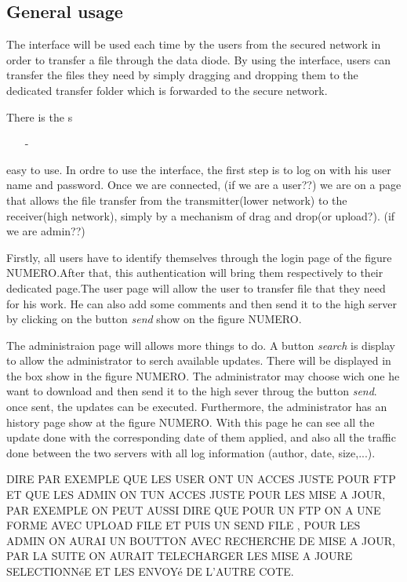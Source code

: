 \documentclass[a4paper,10pt]{article}
\begin{document}
\subsection{General usage}
The interface will be used each time by the users from the secured network
in order to transfer a file through the data diode. By using the interface,
users can transfer the files they need by simply dragging and dropping them to
the dedicated transfer folder which is forwarded to the secure network.

There is the s
\begin{enumerate}
\item[-] 
\end{enumerate}
easy to use. In ordre to use the interface, the first step is to log on with his
user name and password.  Once we are connected, (if we are a user??)
we are on a page that allows the file transfer from the transmitter(lower network)
to the receiver(high network), simply by a mechanism of drag and drop(or upload?).
(if we are admin??)



Firstly, all users have to identify themselves through the login page of the figure NUMERO.After that, this authentication will bring them respectively to their dedicated page.The user page will allow the user to transfer file that they need for his work. He can also add some comments and then send it to the high server by clicking on the button \textit{send} show on the figure NUMERO.

The administraion page will allows more things to do. A button \textit{search} is display to allow the administrator to serch available updates. There will be displayed in the box show in the figure NUMERO. The administrator may choose wich one he want to download and then send it to the high sever throug the button \textit{send}. once sent, the updates can be executed.
Furthermore, the administrator has an history page show at the figure NUMERO. With this page he can see all the update done with the corresponding date of them applied, and also all the traffic done between the two servers with all log information (author, date, size,...).

DIRE PAR EXEMPLE QUE LES USER ONT UN ACCES JUSTE POUR FTP ET QUE LES ADMIN ON TUN ACCES JUSTE POUR LES MISE A JOUR, PAR EXEMPLE ON PEUT AUSSI DIRE QUE POUR UN FTP ON A UNE FORME AVEC UPLOAD FILE ET PUIS UN SEND FILE , POUR LES ADMIN ON AURAI UN BOUTTON AVEC RECHERCHE DE MISE A JOUR, PAR LA SUITE ON AURAIT TELECHARGER LES MISE A JOURE SELECTIONNéE ET LES ENVOYé DE L'AUTRE COTE. 
\end{document}
